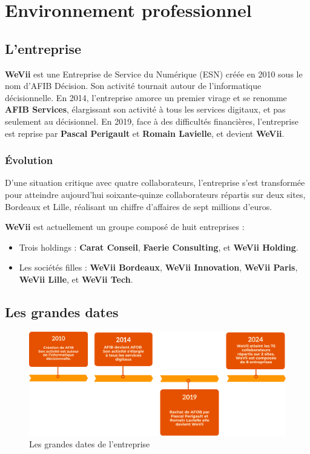 \chapter{Environnement professionnel}

\section{L'entreprise}

\textbf{WeVii} est une Entreprise de Service du Numérique (ESN) créée en 2010 sous le nom d’AFIB Décision.
Son activité tournait autour de l’informatique décisionnelle.
En 2014, l’entreprise amorce un premier virage et se renomme \textbf{AFIB Services},
élargissant son activité à tous les services digitaux, et pas seulement au décisionnel. En 2019, face à des difficultés financières, l’entreprise est reprise par \textbf{Pascal Perigault} et \textbf{Romain Lavielle}, et devient \textbf{WeVii}.

\subsection{Évolution}

D’une situation critique avec quatre collaborateurs, l’entreprise s’est transformée pour atteindre aujourd’hui soixante-quinze collaborateurs répartis sur deux sites, Bordeaux et Lille, réalisant un chiffre d’affaires de sept millions d’euros.

\bigskip

\textbf{WeVii} est actuellement un groupe composé de huit entreprises :
\begin{itemize}
    \item Trois holdings : \textbf{Carat Conseil}, \textbf{Faerie Consulting}, et \textbf{WeVii Holding}.
    \item Les sociétés filles : \textbf{WeVii Bordeaux}, \textbf{WeVii Innovation}, \textbf{WeVii Paris}, \textbf{WeVii Lille}, et \textbf{WeVii Tech}.
\end{itemize}

\section{Les grandes dates}
\begin{figure}[H]
    \centering
    \includegraphics[width=\textwidth]{image/lesGrandesDates}
    \caption[Les grandes dates]{Les grandes dates de l'entreprise}
    \label{fig:grandes_dates}
\end{figure}

